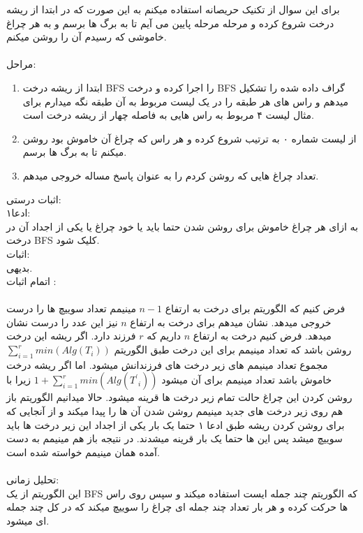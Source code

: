 \problem{}
برای این سوال از تکنیک حریصانه استفاده میکنم به این صورت که 
در ابتدا از ریشه درخت شروع کرده و مرحله مرحله پایین می آیم تا به برگ ها برسم و 
به هر چراغ خاموشی که رسیدم آن را روشن میکنم.\\\\
مراحل:
\begin{enumerate}
    \item 
    ابتدا از ریشه درخت BFS را اجرا کرده
    و درخت BFS گراف داده شده را تشکیل میدهم و 
    راس های هر طبقه را در
    یک لیست مربوط به آن طبقه نگه میدارم
    برای مثال لیست ۴ مربوط به راس هایی به فاصله چهار از ریشه درخت است.
    \item
    از لیست شماره ۰ به ترتیب شروع کرده و هر راس که چراغ آن خاموش بود روشن میکنم
    تا به برگ ها برسم.
    \item
    تعداد چراغ هایی که روشن کردم را به عنوان پاسخ مساله خروجی میدهم.
\end{enumerate}
اثبات درستی:\\
ادعا۱:\\
به ازای هر چراغ خاموش برای روشن شدن حتما باید یا خود چراغ یا
یکی از اجداد آن در درخت BFS
کلیک شود.\\
اثبات:\\
بدیهی.\\


اتمام اثبات :\\\\
فرض کنیم که الگوریتم برای درخت به ارتفاع $n-1$
مینیمم تعداد سوییچ ها را درست خروجی میدهد.
نشان میدهم برای درخت به ارتفاع $n$
نیز این عدد را درست نشان میدهد.
فرض کنیم درخت به ارتفاع $n$
داریم که $r$
فرزند دارد.
اگر ریشه این درخت روشن باشد که تعداد مینیمم برای این درخت طبق الگوریتم
$\sum_{i=1}^{r}{min(Alg(T_i))}$مجموع تعداد مینیمم های زیر درخت های فرزندانش میشود.
اما اگر ریشه درخت خاموش باشد 
تعداد مینیمم برای آن میشود $1+\sum_{i=1}^{r}{min(Alg({T^{\prime}}_i))}$
زیرا با روشن کردن این چراغ حالت تمام زیر درخت ها قرینه میشود.
حالا میدانیم الگوریتم باز هم روی زیر درخت های جدید مینیمم روشن شدن آن ها را 
پیدا میکند و از آنجایی که برای روشن کردن ریشه 
طبق ادعا ۱ حتما یک بار یکی از اجداد این زیر درخت ها باید 
سوییچ میشد پس این ها حتما یک بار قرینه میشدند.
در نتیجه باز هم مینیمم به دست آمده همان مینیمم
خواسته شده است.\\\\
تحلیل زمانی:\\
این الگوریتم از یک BFS که الگوریتم چند جمله ایست استفاده میکند
و سپس روی راس ها حرکت کرده و هر بار تعداد چند جمله ای چراغ را سوییچ میکند که
در کل چند جمله ای میشود.
